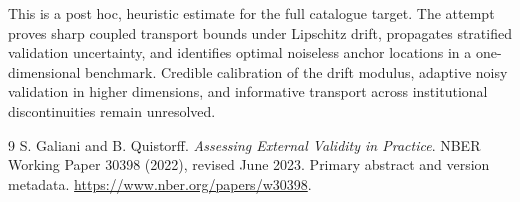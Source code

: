 \documentclass[11pt]{article}
\theoremstyle{remark}
\begin{document}
This is a post hoc, heuristic estimate for the full catalogue target.
The attempt proves sharp coupled transport bounds under Lipschitz drift, propagates stratified validation uncertainty, and identifies optimal noiseless anchor locations in a one-dimensional benchmark. Credible calibration of the drift modulus, adaptive noisy validation in higher dimensions, and informative transport across institutional discontinuities remain unresolved.

\begin{thebibliography}{9}
 S. Galiani and B. Quistorff. \emph{Assessing External Validity in Practice}. NBER Working Paper 30398 (2022), revised June 2023. Primary abstract and version metadata. \url{https://www.nber.org/papers/w30398}.
\end{thebibliography}
\end{document}

